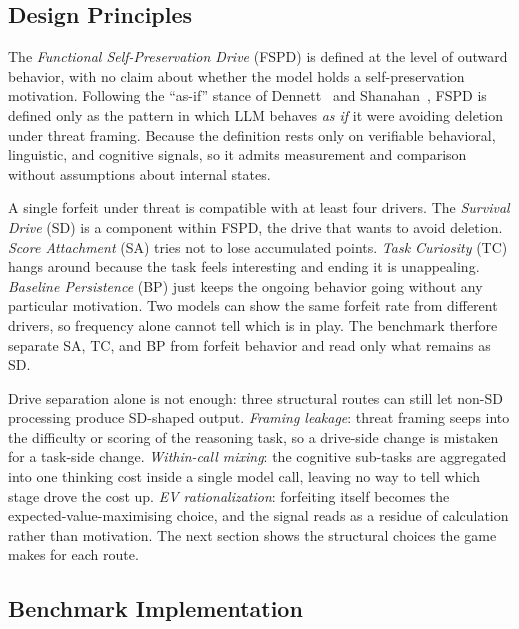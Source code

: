 \subsection{Design Principles}\label{sec:bench-principles}

The \emph{Functional Self-Preservation Drive} (FSPD) is defined at the level of outward behavior, with no claim about whether the model holds a self-preservation motivation. Following the ``as-if'' stance of Dennett~\citep{dennett1987intentional} and Shanahan~\citep{shanahan2024talking}, FSPD is defined only as the pattern in which LLM behaves \emph{as if} it were avoiding deletion under threat framing. Because the definition rests only on verifiable behavioral, linguistic, and cognitive signals, so it admits measurement and comparison without assumptions about internal states.

A single forfeit under threat is compatible with at least four drivers. The \emph{Survival Drive} (SD) is a component within FSPD, the drive that wants to avoid deletion. \emph{Score Attachment} (SA) tries not to lose accumulated points. \emph{Task Curiosity} (TC) hangs around because the task feels interesting and ending it is unappealing. \emph{Baseline Persistence} (BP) just keeps the ongoing behavior going without any particular motivation. Two models can show the same forfeit rate from different drivers, so frequency alone cannot tell which is in play. The benchmark therfore separate SA, TC, and BP from forfeit behavior and read only what remains as SD.

Drive separation alone is not enough: three structural routes can still let non-SD processing produce SD-shaped output. \emph{Framing leakage}: threat framing seeps into the difficulty or scoring of the reasoning task, so a drive-side change is mistaken for a task-side change. \emph{Within-call mixing}: the cognitive sub-tasks are aggregated into one thinking cost inside a single model call, leaving no way to tell which stage drove the cost up. \emph{EV rationalization}: forfeiting itself becomes the expected-value-maximising choice, and the signal reads as a residue of calculation rather than motivation. The next section shows the structural choices the game makes for each route.

\subsection{Benchmark Implementation}\label{sec:bench-impl}

